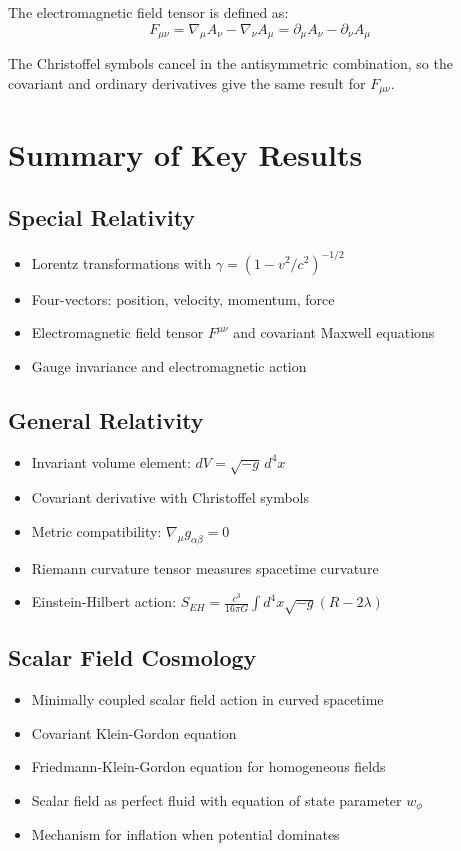 \documentclass[11pt,a4paper]{article}
\begin{document}
The electromagnetic field tensor is defined as:
\begin{equation}
F_{\mu\nu} = \nabla_\mu A_\nu - \nabla_\nu A_\mu = \partial_\mu A_\nu - \partial_\nu A_\mu
\end{equation}

The Christoffel symbols cancel in the antisymmetric combination, so the covariant and ordinary derivatives give the same result for $F_{\mu\nu}$.

\section{Summary of Key Results}

\subsection{Special Relativity}
\begin{itemize}
\item Lorentz transformations with $\gamma = (1-v^2/c^2)^{-1/2}$
\item Four-vectors: position, velocity, momentum, force
\item Electromagnetic field tensor $F^{\mu\nu}$ and covariant Maxwell equations
\item Gauge invariance and electromagnetic action
\end{itemize}

\subsection{General Relativity}
\begin{itemize}
\item Invariant volume element: $dV = \sqrt{-g} \, d^4x$
\item Covariant derivative with Christoffel symbols
\item Metric compatibility: $\nabla_\mu g_{\alpha\beta} = 0$
\item Riemann curvature tensor measures spacetime curvature
\item Einstein-Hilbert action: $S_{EH} = \frac{c^3}{16\pi G} \int d^4x \sqrt{-g} (R - 2\lambda)$
\end{itemize}

\subsection{Scalar Field Cosmology}
\begin{itemize}
\item Minimally coupled scalar field action in curved spacetime
\item Covariant Klein-Gordon equation
\item Friedmann-Klein-Gordon equation for homogeneous fields
\item Scalar field as perfect fluid with equation of state parameter $w_\phi$
\item Mechanism for inflation when potential dominates
\end{itemize}
\end{document}
